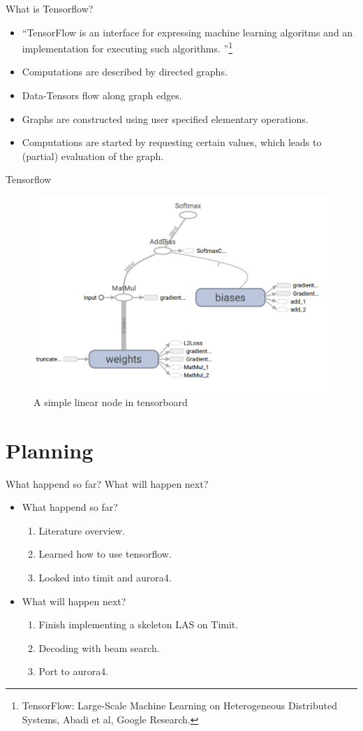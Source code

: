 \documentclass{beamer}
\begin{document}
\begin{frame}{What is Tensorflow?}
	\begin{itemize}
		\item \textquotedblleft TensorFlow is an interface for expressing machine learning algoritms and an implementation for executing such algorithms. \textquotedblright \footnote{TensorFlow:
			  Large-Scale Machine Learning on Heterogeneous Distributed Systems, Abadi et al, Google Research.}
		\item Computations are described by directed graphs. 
		\item Data-Tensors flow along graph edges.
		\item Graphs are constructed using user specified elementary
			  operations.
		\item Computations are started by requesting certain values, which leads
			  to (partial) evaluation of the graph.
	\end{itemize}
\end{frame}


\begin{frame}{Tensorflow}
\begin{figure}
\centering
\includegraphics[width=0.7\linewidth]{../png/net1}
\caption{A simple linear node in tensorboard}
\label{fig:net1}
\end{figure}
\end{frame}

\section{Planning}
\begin{frame}{What happend so far? What will happen next?}
\begin{itemize}
\item What happend so far?
	\begin{enumerate}
		\item Literature overview.
		\item Learned how to use tensorflow.
		\item Looked into timit and aurora4.
	\end{enumerate}
\item What will happen next?
		\begin{enumerate}
			\item Finish implementing a skeleton LAS on Timit. 
			\item Decoding with beam search.
			\item Port to aurora4.
		\end{enumerate}
\end{itemize}
\end{frame}
\end{document}
